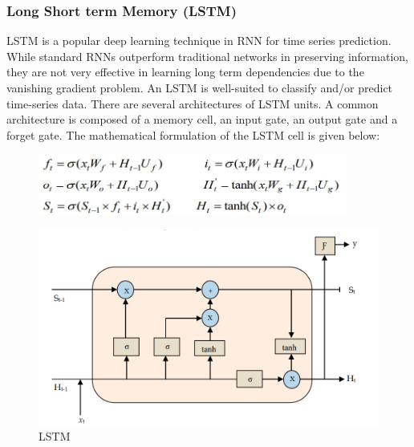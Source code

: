 \subsubsection{Long Short term Memory (LSTM)}
LSTM is a popular deep learning technique in RNN for time series prediction. While standard RNNs outperform traditional networks in preserving information, they are not very effective in learning long term dependencies due to the vanishing gradient problem. An LSTM is well-suited to classify and/or predict time-series data. There are several architectures of LSTM units. A common architecture is composed of a memory cell, an input gate, an output gate and a forget gate. The mathematical formulation of the LSTM cell is given below:
\begin{figure}[tbh] %
\begin{center}
	\includegraphics[width=4in]{images/lstmform.jpg} 
\end{center}
\end{figure}
\begin{figure}[tbh] %
\begin{center}
	\includegraphics[width=6in]{images/l1.png} 
	\caption{LSTM} %
	\label{LSTM} %
\end{center}
\end{figure}
